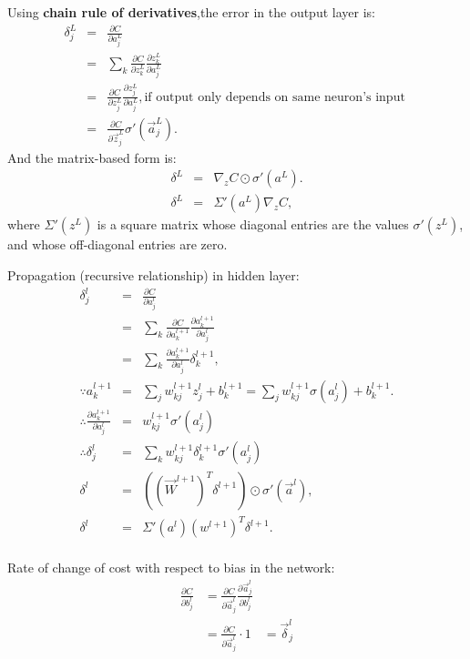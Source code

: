 Using \textbf{chain rule of derivatives},the error in the output layer is:
\begin{eqnarray} 
\delta^L_j &=& \frac{\partial C}{\partial a^L_j} \\
&=& \sum_k \frac{\partial C}{\partial z^L_k} \frac{\partial z^L_k}{\partial a^L_j} \\
&=& \frac{\partial C}{\partial z^L_j} \frac{\partial z^L_j}{\partial a^L_j},\text{if output only depends on same neuron's input } \\
&=& \frac{\partial C}{\partial \vec{z}^L_j} \sigma'(\vec{a}^L_j).
\end{eqnarray}
And the matrix-based form is:
\begin{eqnarray} 
\delta^L & = & \nabla_z C \odot \sigma'(a^L). \\
\delta^L & = &\Sigma'(a^L) \nabla_z C,
\end{eqnarray}
where $\Sigma'(z^L)$ is a square matrix whose diagonal entries are the values $\sigma'(z^L)$, and whose off-diagonal entries are zero.

Propagation (recursive relationship) in hidden layer:
\begin{eqnarray} 
\delta_j^l &=& \frac{\partial C}{\partial a^l_j}\\
&=& \sum_k \frac{\partial C}{\partial a^{l+1}_k} \frac{\partial a^{l+1}_k}{\partial a^l_j}\\ 
&=& \sum_k \frac{\partial a^{l+1}_k}{\partial a^l_j} \delta^{l+1}_k, \\
\because a^{l+1}_k &=& \sum_j w^{l+1}_{kj} z^l_j +b^{l+1}_k = \sum_j w^{l+1}_{kj} \sigma(a^l_j) +b^{l+1}_k. \\
\therefore \frac{\partial a^{l+1}_k}{\partial a^l_j} &=& w^{l+1}_{kj} \sigma'(a^l_j) \\
\therefore
\delta^l_j &=& \sum_k w^{l+1}_{kj}  \delta^{l+1}_k \sigma'(a^l_j) \\
\delta^l &=& ((\vec{W}^{l+1})^T \delta^{l+1}) \odot \sigma'(\vec{a}^l), \\
\delta^l &=& \Sigma'(a^l) (w^{l+1})^T \delta^{l+1}.\\
\end{eqnarray}

Rate of change of cost with respect to bias in the network:
\begin{eqnarray}  
\frac{\partial C}{\partial b^l_j} 
&=\frac{\partial C}{\partial \vec{a}^l_j}\frac{\partial \vec{a}^l_j}{\partial b^l_j} \\
&= \frac{\partial C}{\partial \vec{a}^l_j} \cdot 1 
&=\vec{\delta}^l_j 
\end{eqnarray}

